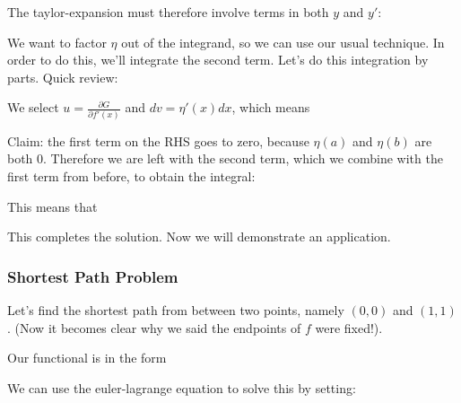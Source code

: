 \documentclass[12pt]{article}
\begin{document}
The taylor-expansion must therefore involve terms in both $y$ and $y'$:


We want to factor $\eta$ out of the integrand, so we can use our usual technique. In order to do this, we'll integrate the second term. Let's do this integration by parts. Quick review:


We select $u = \frac{\partial G}{\partial f'(x)}$ and $dv = \eta'(x) dx$, which means



Claim: the first term on the RHS goes to zero, because $\eta(a)$ and $\eta(b)$ are both 0. Therefore we are left with the second term, which we combine with the first term from before, to obtain the integral:


This means that


This completes the solution. Now we will demonstrate an application.

\subsubsection{Shortest Path Problem}

Let's find the shortest path from between two points, namely $(0,0)$ and $(1,1)$. (Now it becomes clear why we said the endpoints of $f$ were fixed!).

Our functional is in the form


We can use the euler-lagrange equation to solve this by setting:
\end{document}
